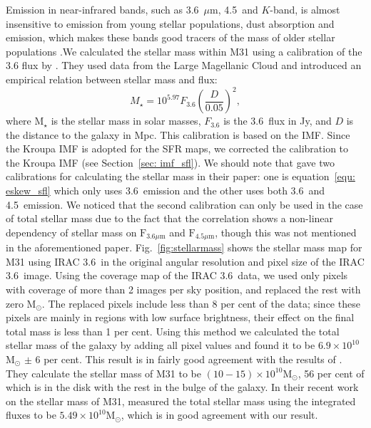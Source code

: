 Emission in near-infrared bands, such as 3.6~$\mu$m, 4.5~\um and $K$-band, is almost insensitive to emission from young stellar populations, dust absorption and emission, which makes these bands good tracers of the mass of older stellar populations \citep[e.g.][]{Elmgreen84, Eskew12, Zhu10}.We calculated the stellar mass within M31 using a calibration of the 3.6 \um flux by \citet{Eskew12}. They used data from the Large Magellanic Cloud and introduced an empirical relation between stellar mass and flux:
\begin{equation}
\label{equ: eskew_sfl}
M _{\star}= 10^{5.97} F_{3.6}\left(\frac{D}{0.05}\right)^2,
\end{equation}
\noindent where M$_{\star}$ is the stellar mass in solar masses, $F_{3.6}$ is the 3.6~\um flux in Jy, and $D$ is the distance to the galaxy in Mpc. This calibration is based on the \citet{Salpeter55} IMF. Since the Kroupa IMF is adopted for the SFR maps, we corrected the calibration to the Kroupa IMF (see Section~\ref{sec: imf_sfl}). We should note that \citet{Eskew12} gave two calibrations for calculating the stellar mass in their paper: one is equation~\ref{equ: eskew_sfl} which only uses 3.6~\um emission and the other uses both 3.6~\um and 4.5~\um emission. We noticed that the second calibration can only be used in the case of total stellar mass due to the fact that the correlation shows a non-linear dependency of stellar mass on $\mathrm{F}_{3.6 \mu \mathrm{m}}$ and $\mathrm{F}_{4.5 \mu \mathrm{m}}$, though this was not mentioned in the aforementioned paper. 
Fig.~\ref{fig:stellarmass} shows the stellar mass map for M31 using IRAC 3.6~\um in the original angular resolution and pixel size of the IRAC 3.6~\um image. Using the coverage map of the IRAC 3.6~\um data, we used only pixels with coverage of more than 2 images per sky position, and replaced the rest with zero M$_{\odot}$. The replaced pixels include less than 8 per cent of the data;  since these pixels are mainly  in regions with low surface brightness, their effect on the final total mass is less than 1 per cent.
Using this method we calculated the total stellar mass of the galaxy by adding all pixel values and found it to be $6.9 \times 10^{10}$M$_{\odot}$ $\pm$ 6 per cent. This result is in fairly good agreement with the results of \citet{Tamm12}. They calculate the stellar mass of M31 to be $(10-15) \times 10^{10}$M$_{\odot}$, 56 per cent of which is in the disk with the rest in the bulge of the galaxy. In their recent work on the stellar mass of M31, \cite{Viaene14} measured the total stellar mass using the integrated fluxes to be $5.49 \times 10^{10}$M$_{\odot}$, which is in good agreement with our result.


